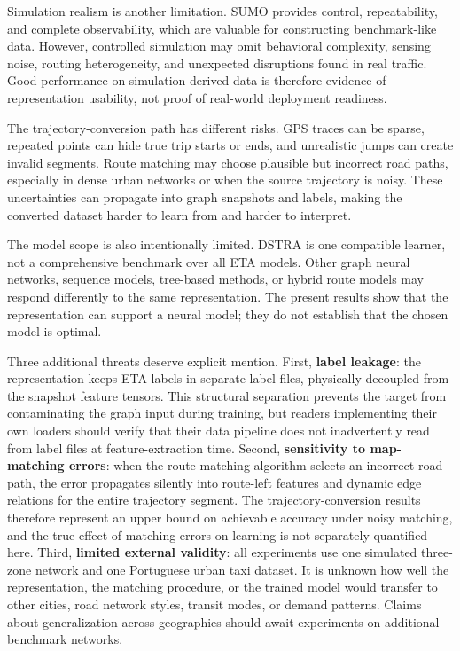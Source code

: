 Simulation realism is another limitation. SUMO provides control, repeatability, and complete observability, which are valuable for constructing benchmark-like data. However, controlled simulation may omit behavioral complexity, sensing noise, routing heterogeneity, and unexpected disruptions found in real traffic. Good performance on simulation-derived data is therefore evidence of representation usability, not proof of real-world deployment readiness.

The trajectory-conversion path has different risks. GPS traces can be sparse, repeated points can hide true trip starts or ends, and unrealistic jumps can create invalid segments. Route matching may choose plausible but incorrect road paths, especially in dense urban networks or when the source trajectory is noisy. These uncertainties can propagate into graph snapshots and labels, making the converted dataset harder to learn from and harder to interpret.

The model scope is also intentionally limited. DSTRA is one compatible learner, not a comprehensive benchmark over all ETA models. Other graph neural networks, sequence models, tree-based methods, or hybrid route models may respond differently to the same representation. The present results show that the representation can support a neural model; they do not establish that the chosen model is optimal.

Three additional threats deserve explicit mention. First, \textbf{label leakage}: the representation keeps ETA labels in separate label files, physically decoupled from the snapshot feature tensors. This structural separation prevents the target from contaminating the graph input during training, but readers implementing their own loaders should verify that their data pipeline does not inadvertently read from label files at feature-extraction time. Second, \textbf{sensitivity to map-matching errors}: when the route-matching algorithm selects an incorrect road path, the error propagates silently into route-left features and dynamic edge relations for the entire trajectory segment. The trajectory-conversion results therefore represent an upper bound on achievable accuracy under noisy matching, and the true effect of matching errors on learning is not separately quantified here. Third, \textbf{limited external validity}: all experiments use one simulated three-zone network and one Portuguese urban taxi dataset. It is unknown how well the representation, the matching procedure, or the trained model would transfer to other cities, road network styles, transit modes, or demand patterns. Claims about generalization across geographies should await experiments on additional benchmark networks.

